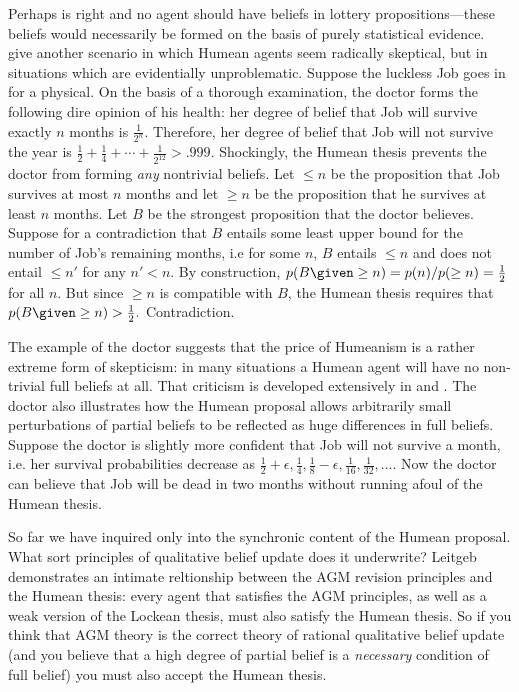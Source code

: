 Perhaps \citet{buchak2014belief} is right and no agent should have beliefs in
lottery propositions---these beliefs would necessarily be formed on the basis of
purely statistical evidence. \citet{lin2019correspondence} give another scenario
in which Humean agents seem radically skeptical, but in situations which are
evidentially unproblematic. Suppose the luckless Job goes in for a physical. On
the basis of a thorough examination, the doctor forms the following dire opinion
of his health: her degree of belief that Job will survive exactly $n$ months is
$\frac{1}{2^n}.$ Therefore, her degree of belief that Job will not survive the
year is $\frac{1}{2} + \frac{1}{4} + \cdots + \frac{1}{2^{12}} > .999.$
Shockingly, the Humean thesis prevents the doctor from forming {\em any}
nontrivial beliefs. Let $\leq n$ be the proposition that Job survives at most
$n$ months and let $\geq n$ be the proposition that he survives at least $n$
months. Let $B$ be the strongest proposition that the doctor believes. Suppose
for a contradiction that $B$ entails some least upper bound for the number of
Job's remaining months, i.e for some $n$, $B$ entails $\leq n$ and does not
entail $\leq n'$ for any $n'<n$.  By construction, $p(B \given \geq n) =
p(n)/p(\geq n) = \frac{1}{2}$ for all $n$. But since $\geq n$ is compatible with
$B$, the Humean thesis requires that $p(B \given  \geq n) > \frac{1}{2}.$
Contradiction. 

The example of the doctor suggests that the price of Humeanism is a rather
extreme form of skepticism: in many situations a Humean agent will have no
non-trivial full beliefs at all. That criticism is developed extensively in
\citet{rott2017stability} and \citet{douven2018probabilities}. The doctor also
illustrates how the Humean proposal allows arbitrarily small perturbations of
partial beliefs to be reflected as huge differences in full beliefs. Suppose the
doctor is slightly more confident that Job will not survive a month, i.e. her
survival probabilities decrease as $\frac{1}{2} + \epsilon, \frac{1}{4},
\frac{1}{8} - \epsilon, \frac{1}{16}, \frac{1}{32}, \ldots.$ Now the doctor can
believe that Job will be dead in two months without running afoul of the Humean
thesis.

So far we have inquired  only into the synchronic content of the Humean
proposal. What sort principles of qualitative belief update does it underwrite?
Leitgeb demonstrates an intimate reltionship between the AGM revision principles
and the Humean thesis: every agent that satisfies the AGM principles, as well as
a weak version of the Lockean thesis, must also satisfy the Humean thesis. So if
you think that AGM theory is the correct theory of rational qualitative belief
update (and you believe that a high degree of partial belief is a {\em
necessary} condition of full belief) you must also accept the Humean thesis.


